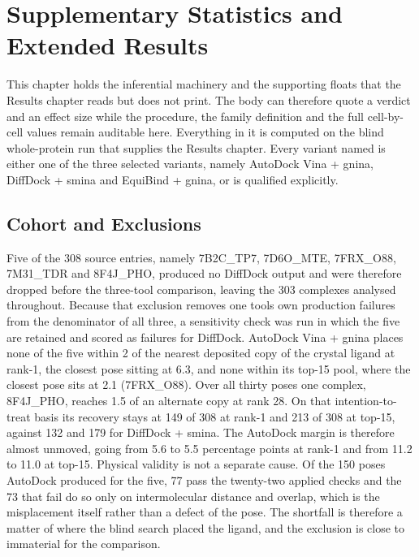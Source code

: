 \hypertarget{supplementary-statistics}{%
\chapter{Supplementary Statistics and Extended Results}\label{supplementary-statistics}}

This chapter holds the inferential machinery and the supporting floats that the Results chapter reads but does not print. The body can therefore quote a verdict and an effect size while the procedure, the family definition and the full cell-by-cell values remain auditable here. Everything in it is computed on the blind whole-protein run that supplies the Results chapter. Every variant named is either one of the three selected variants, namely AutoDock Vina + gnina, DiffDock + smina and EquiBind + gnina, or is qualified explicitly.

\hypertarget{cohort-and-exclusions}{%
\section{Cohort and Exclusions}\label{cohort-and-exclusions}}

Five of the 308 source entries, namely 7B2C\_TP7, 7D6O\_MTE, 7FRX\_O88, 7M31\_TDR and 8F4J\_PHO, produced no DiffDock output and were therefore dropped before the three-tool comparison, leaving the 303 complexes analysed throughout. Because that exclusion removes one tool\textquotesingle s own production failures from the denominator of all three, a sensitivity check was run in which the five are retained and scored as failures for DiffDock. AutoDock Vina + gnina places none of the five within 2\angstrom{} of the nearest deposited copy of the crystal ligand at rank-1, the closest pose sitting at 6.3\angstrom{}, and none within its top-15 pool, where the closest pose sits at 2.1\angstrom{} (7FRX\_O88). Over all thirty poses one complex, 8F4J\_PHO, reaches 1.5\angstrom{} of an alternate copy at rank 28. On that intention-to-treat basis its recovery stays at 149 of 308 at rank-1 and 213 of 308 at top-15, against 132 and 179 for DiffDock + smina. The AutoDock margin is therefore almost unmoved, going from 5.6 to 5.5 percentage points at rank-1 and from 11.2 to 11.0 at top-15. Physical validity is not a separate cause. Of the 150 poses AutoDock produced for the five, 77 pass the twenty-two applied checks and the 73 that fail do so only on intermolecular distance and overlap, which is the misplacement itself rather than a defect of the pose. The shortfall is therefore a matter of where the blind search placed the ligand, and the exclusion is close to immaterial for the comparison.

